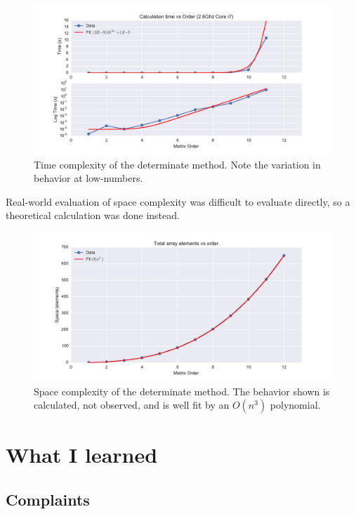 \documentclass[a4paper,12pt]{article}
\begin{document}
\begin{figure}[h]
    \centering
    \includegraphics[width=.9\textwidth]{time_complexity.pdf}
    \caption{Time complexity of the determinate method.  Note the variation in behavior at low-numbers.}
    \label{fig:mesh1}
\end{figure}

Real-world evaluation of space complexity was difficult to evaluate directly, so a theoretical calculation was done instead.  
\begin{figure}[h]
    \centering
    \includegraphics[width=.9\textwidth]{space_complexity.pdf}
    \caption{Space complexity of the determinate method.  The behavior shown is calculated, not observed, and is well fit by
     an $O(n^3)$ polynomial.}
    \label{fig:mesh1}
\end{figure}



\section{What I learned}

\subsection{Complaints}
\end{document}
